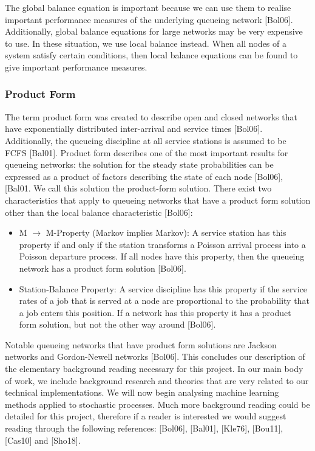 \documentclass[a4paper,11pt,titlepage]{article}
\begin{document}
The global balance equation is important because we can use them to realise important performance measures of the underlying queueing network [Bol06]. Additionally, global balance equations for large networks may be very expensive to use. In these situation, we use local balance instead. When all nodes of a system satisfy certain conditions, then local balance equations can be found to give important performance measures.

\subsubsection{Product Form}

The term product form was created to describe open and closed networks that have exponentially distributed inter-arrival and service times [Bol06]. Additionally, the queueing discipline at all service stations is assumed to be FCFS [Bal01]. Product form describes one of the most important results for queueing networks: the solution for the steady state probabilities can be expressed as a product of factors describing the state of each node [Bol06], [Bal01. We call this solution the product-form solution. There exist two characteristics that apply to queueing networks that have a product form solution other than the local balance characteristic [Bol06]:

\begin{itemize}
    \item M $\rightarrow$ M-Property (Markov implies Markov): A service station has this property if and only if the station transforms a Poisson arrival process into a Poisson departure process. If all nodes have this property, then the queueing network has a product form solution [Bol06]. 
    \item Station-Balance Property: A service discipline has this property if the service rates of a job that is served at a node are proportional to the probability that a job enters this position. If a network has this property it has a product form solution, but not the other way around [Bol06]. 
\end{itemize}

Notable queueing networks that have product form solutions are Jackson networks and Gordon-Newell networks [Bol06]. This concludes our description of the elementary background reading necessary for this project. In our main body of work, we include background research and theories that are very related to our technical implementations. We will now begin analysing machine learning methods applied to stochastic processes. Much more background reading could be detailed for this project, therefore if a reader is interested we would suggest reading through the following references: [Bol06], [Bal01], [Kle76], [Bou11], [Cas10] and [Sho18].
\end{document}
